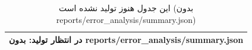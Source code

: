 \begin{table}[H]
\centering
\caption{این جدول هنوز تولید نشده است (بدون reports/error\_analysis/summary.json)}
\label{tab:v2-errors}
\begin{tabular}{l}
\toprule
در انتظار تولید: بدون reports/error\_analysis/summary.json \\
\bottomrule
\end{tabular}
\end{table}
